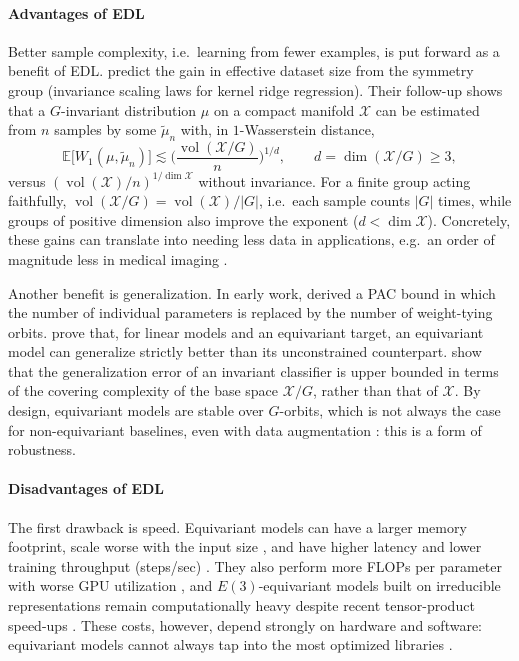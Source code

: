 \documentclass[mathematics,review,submit,moreauthors]{Definitions/mdpi}
\begin{document}
\paragraph{Advantages of EDL}
Better sample complexity, i.e.\ learning from fewer examples, is put forward as a benefit of EDL.
\citet{tahmasebi2023} predict the gain in effective dataset size from the symmetry group (invariance scaling laws for kernel ridge regression).
Their follow-up \citep{tahmasebi2024p4icml} shows that a $G$-invariant distribution $\mu$ on a compact manifold $\mathcal{X}$ can be estimated from $n$ samples by some $\tilde{\mu}_n$ with, in $1$-Wasserstein distance,
\[
    \mathbb{E}\big[W_1(\mu,\tilde{\mu}_n)\big] \lesssim \Big(\frac{\operatorname{vol}(\mathcal{X}/G)}{n}\Big)^{1/d}, \qquad d = \dim(\mathcal{X}/G) \geq 3,
\]
versus $(\operatorname{vol}(\mathcal{X})/n)^{1/\dim\mathcal{X}}$ without invariance.
For a finite group acting faithfully, $\operatorname{vol}(\mathcal{X}/G) = \operatorname{vol}(\mathcal{X})/|G|$, i.e.\ each sample counts $|G|$ times, while groups of positive dimension also improve the exponent ($d < \dim\mathcal{X}$).
Concretely, these gains can translate into needing less data in applications, e.g.\ an order of magnitude less in medical imaging \citep{winkels2019mia}.

Another benefit is generalization.
In early work, \citet{shawe-taylor1991anips} derived a PAC bound in which the number of individual parameters is replaced by the number of weight-tying orbits.
\citet{elesedy2021p3icml} prove that, for linear models and an equivariant target, an equivariant model can generalize strictly better than its unconstrained counterpart.
\citet{sokolic2017p2icais} show that the generalization error of an invariant classifier is upper bounded in terms of the covering complexity of the base space $\mathcal{X}/G$, rather than that of $\mathcal{X}$.
By design, equivariant models are stable over $G$-orbits, which is not always the case for non-equivariant baselines, even with data augmentation \citep{lafarge2021mia}: this is a form of robustness.

\paragraph{Disadvantages of EDL}
The first drawback is speed.
Equivariant models can have a larger memory footprint, scale worse with the input size \citep{bogatskiy2020p3icml}, and have higher latency and lower training throughput (steps/sec) \citep{gerken2022p3icml,elhag2026}.
They also perform more FLOPs per parameter with worse GPU utilization \citep{brehmer2025}, and $E(3)$-equivariant models built on irreducible representations remain computationally heavy despite recent tensor-product speed-ups \citep{passaro2023,luo2024a}.
These costs, however, depend strongly on hardware and software: equivariant models cannot always tap into the most optimized libraries \citep{qu2024anips,shen2026}.
\end{document}
